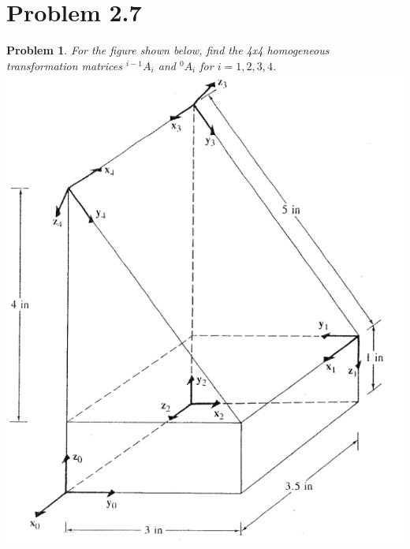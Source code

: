 \documentclass{article}
\newtheorem{prob}{Problem}
\numberwithin{prob}{section}
\begin{document}
\section{Problem 2.7}
\begin{prob}
  For the figure shown below, find the 4x4 homogeneous transformation matrices $^{i-1}A_i$ and $^0A_i$ for $i=1,2,3,4$.\\
  \includegraphics[width=0.5\linewidth]{media/hw3.2.7.png}
\end{prob}
\end{document}
